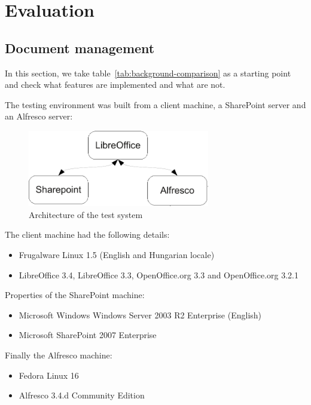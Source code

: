 \chapter{Evaluation}

\section{Document management}

In this section, we take table~\ref{tab:background-comparison} as a starting
point and check what features are implemented and what are not.

The testing environment was built from a client machine, a SharePoint server
and an Alfresco server:

\begin{figure}[H]
\centering
\includegraphics[width=300px,keepaspectratio]{test-arch.pdf}
\caption{Architecture of the test system}
\end{figure}

The client machine had the following details:
\begin{itemize}
\item Frugalware Linux 1.5 (English and Hungarian locale)
\item LibreOffice 3.4, LibreOffice 3.3, OpenOffice.org 3.3 and OpenOffice.org 3.2.1
\end{itemize}

Properties of the SharePoint machine:

\begin{itemize}
\item Microsoft Windows Windows Server 2003 R2 Enterprise (English)
\item Microsoft SharePoint 2007 Enterprise
\end{itemize}

Finally the Alfresco machine:

\begin{itemize}
\item Fedora Linux 16
\item Alfresco 3.4.d Community Edition
\end{itemize}

